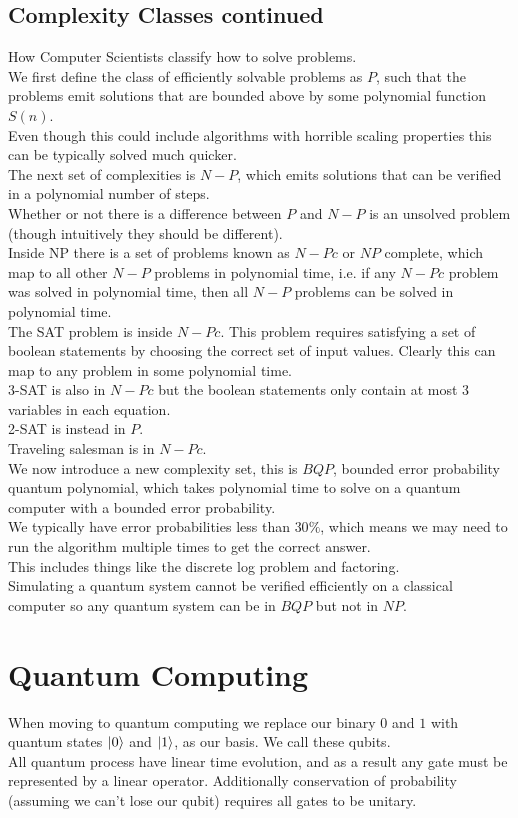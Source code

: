 \subsection{Complexity Classes continued}
How Computer Scientists classify how to solve problems.\\
We first define the class of efficiently solvable problems as $P$, such that the problems emit solutions that are bounded above by some polynomial function $S(n)$. \\
Even though this could include algorithms with horrible scaling properties this can be typically solved much quicker. \\
The next set of complexities is $N-P$, which emits solutions that can be verified in a polynomial number of steps. \\
Whether or not there is a difference between $P$ and $N-P$ is an unsolved problem (though intuitively they should be different). \\
Inside NP there is a set of problems known as $N-Pc$ or $NP$ complete, which map to all other $N-P$ problems in polynomial time, i.e. if any $N-Pc$ problem was solved in polynomial time, then all $N-P$ problems can be solved in polynomial time. \\
The SAT problem is inside $N-Pc$. This problem requires satisfying a set of boolean statements by choosing the correct set of input values. Clearly this can map to any problem in some polynomial time. \\
3-SAT is also in $N-Pc$ but the boolean statements only contain at most 3 variables in each equation. \\
2-SAT is instead in $P$. \\
Traveling salesman is in $N-Pc$. \\
We now introduce a new complexity set, this is $BQP$, bounded error probability quantum polynomial, which takes polynomial time to solve on a quantum computer with a bounded error probability. \\
We typically have error probabilities less than $30\%$, which means we may need to run the algorithm multiple times to get the correct answer. \\
This includes things like the discrete log problem and factoring. \\
Simulating a quantum system cannot be verified efficiently on a classical computer so any quantum system can be in $BQP$ but not in $NP$. \\
\section{Quantum Computing}
When moving to quantum computing we replace our binary $0$ and $1$ with quantum states $\ket{0}$ and $\ket{1}$, as our basis. We call these qubits. \\
All quantum process have linear time evolution, and as a result any gate must be represented by a linear operator. Additionally conservation of probability (assuming we can't lose our qubit) requires all gates to be unitary.
